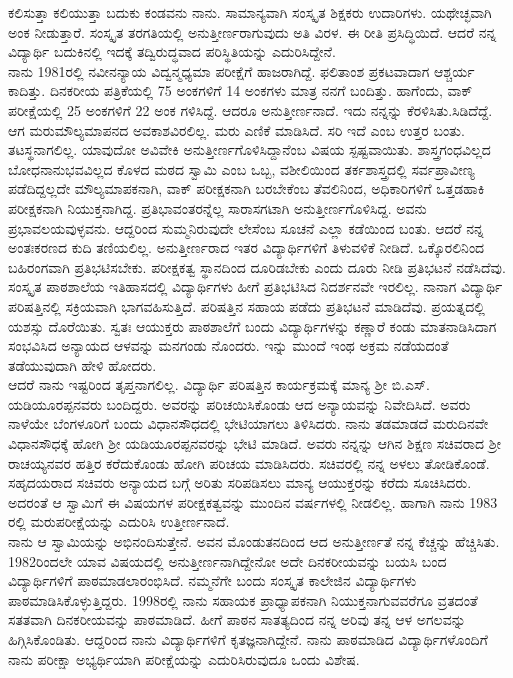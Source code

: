 {ಕಲಿಸುತ್ತಾ ಕಲಿಯುತ್ತಾ ಬದುಕು ಕಂಡವನು ನಾನು. ಸಾಮಾನ್ಯವಾಗಿ ಸಂಸ್ಕೃತ ಶಿಕ್ಷಕರು ಉದಾರಿಗಳು.  ಯಥೇಚ್ಛವಾಗಿ ಅಂಕ ನೀಡುತ್ತಾರೆ.  ಸಂಸ್ಕೃತ ತರಗತಿಯಲ್ಲಿ ಅನುತ್ತೀರ್ಣರಾಗುವುದು ಅತಿ ವಿರಳ. ಈ ರೀತಿ ಪ್ರಸಿದ್ಧಿಯಿದೆ. ಆದರೆ ನನ್ನ ವಿದ್ಯಾರ್ಥಿ ಬದುಕಿನಲ್ಲಿ ಇದಕ್ಕೆ ತದ್ವಿರುದ್ಧವಾದ ಪರಿಸ್ಥಿತಿಯನ್ನು ಎದುರಿಸಿದ್ದೇನೆ.  
~\\[0.4cm]
ನಾನು 1981ರಲ್ಲಿ ನವೀನನ್ಯಾಯ ವಿದ್ವನ್ಮಧ್ಯಮಾ ಪರೀಕ್ಷೆಗೆ ಹಾಜರಾಗಿದ್ದೆ.  ಫಲಿತಾಂಶ ಪ್ರಕಟವಾದಾಗ ಆಶ್ಚರ್ಯ ಕಾದಿತ್ತು.  ದಿನಕರೀಯ ಪತ್ರಿಕೆಯಲ್ಲಿ 75 ಅಂಕಗಳಿಗೆ 14 ಅಂಕಗಳು ಮಾತ್ರ ನನಗೆ ಬಂದಿತ್ತು. ಹಾಗೆಂದು, ವಾಕ್ ಪರೀಕ್ಷೆಯಲ್ಲಿ 25 ಅಂಕ\-ಗಳಿಗೆ 22 ಅಂಕ ಗಳಿಸಿದ್ದೆ.  ಆದರೂ ಅನುತ್ತೀರ್ಣನಾದೆ.  ಇದು ನನ್ನನ್ನು ಕೆರಳಿಸಿತು.\break  ಸಿಡಿದೆದ್ದೆ. ಆಗ ಮರುಮೌಲ್ಯಮಾಪನದ ಅವಕಾಶವಿರಲಿಲ್ಲ.  ಮರು ಎಣಿಕೆ ಮಾಡಿಸಿದೆ.  ಸರಿ ಇದೆ ಎಂಬ ಉತ್ತರ ಬಂತು.  ತಟಸ್ಥನಾಗಲಿಲ್ಲ.  ಯಾವುದೋ ಅವಿವೇಕಿ ಅನುತ್ತೀರ್ಣ\-ಗೊಳಿಸಿದ್ದಾನೆಂಬ  ವಿಷಯ ಸ್ಪಷ್ಟವಾಯಿತು.  ಶಾಸ್ತ್ರಗಂಧವಿಲ್ಲದ ಬೋಧನಾನುಭವ\-ವಿಲ್ಲದ ಕೊಳದ ಮಠದ ಸ್ವಾಮಿ ಎಂಬ ಒಬ್ಬ, ವಶೀಲಿಯಿಂದ ತರ್ಕಶಾಸ್ತ್ರದಲ್ಲಿ ಸರ್ವ\-ಪ್ರಾವೀಣ್ಯ ಪಡೆದಿದ್ದಲ್ಲದೇ ಮೌಲ್ಯಮಾಪಕನಾಗಿ, ವಾಕ್ ಪರೀಕ್ಷಕನಾಗಿ ಬರಬೇಕೆಂಬ ತೆವಲಿನಿಂದ, ಅಧಿಕಾರಿಗಳಿಗೆ ಒತ್ತಡಹಾಕಿ ಪರೀಕ್ಷಕನಾಗಿ ನಿಯುಕ್ತನಾಗಿದ್ದ.  ಪ್ರತಿಭಾ\-ವಂತರನ್ನೆಲ್ಲ ಸಾರಾಸಗಟಾಗಿ ಅನುತ್ತೀರ್ಣಗೊಳಿಸಿದ್ದ.  ಅವನು ಪ್ರಭಾವಲಯವುಳ್ಳವನು.  ಆದ್ದರಿಂದ ಸುಮ್ಮನಿರುವುದೇ ಲೇಸೆಂಬ ಸೂಚನೆ ಎಲ್ಲಾ ಕಡೆಯಿಂದ ಬಂತು.  ಆದರೆ ನನ್ನ ಅಂತಃಕರಣದ ಕುದಿ ತಣಿಯಲಿಲ್ಲ.  ಅನುತ್ತೀರ್ಣರಾದ ಇತರ \hbox{ವಿದ್ಯಾರ್ಥಿಗಳಿಗೆ} \hbox{ತಿಳುವಳಿಕೆ} ನೀಡಿದೆ.  ಒಕ್ಕೊರಲಿನಿಂದ ಬಹಿರಂಗವಾಗಿ ಪ್ರತಿಭಟಿಸಬೇಕು. \hbox{ಪರೀಕ್ಷಕತ್ವ} ಸ್ಥಾನದಿಂದ ದೂರಿಡಬೇಕು ಎಂದು ದೂರು ನೀಡಿ ಪ್ರತಿಭಟನೆ ನಡೆಸಿದೆವು.  ಸಂಸ್ಕೃತ ಪಾಠಶಾಲೆಯ ಇತಿಹಾಸದಲ್ಲಿ ವಿದ್ಯಾರ್ಥಿಗಳು ಹೀಗೆ ಪ್ರತಿಭಟಿಸಿದ ನಿದರ್ಶನವೇ ಇರಲಿಲ್ಲ.  ನಾನಾಗ ವಿದ್ಯಾರ್ಥಿ ಪರಿಷತ್ತಿನಲ್ಲಿ ಸಕ್ರಿಯವಾಗಿ ಭಾಗವಹಿಸುತ್ತಿದೆ.  ಪರಿಷತ್ತಿನ ಸಹಾಯ ಪಡೆದು ಪ್ರತಿಭಟನೆ ಮಾಡಿದೆವು.  ಪ್ರಯತ್ನದಲ್ಲಿ ಯಶಸ್ಸು ದೊರೆಯಿತು.  ಸ್ವತಃ ಆಯುಕ್ತರು ಪಾಠಶಾಲೆಗೆ ಬಂದು ವಿದ್ಯಾರ್ಥಿಗಳನ್ನು ಕಣ್ಣಾರೆ ಕಂಡು ಮಾತನಾಡಿಸಿದಾಗ ಸಂಭವಿ\-ಸಿದ ಅನ್ಯಾಯದ ಆಳವನ್ನು ಮನಗಂಡು ನೊಂದರು.  ಇನ್ನು ಮುಂದೆ ಇಂಥ ಅಕ್ರಮ ನಡೆಯದಂತೆ ತಡೆಯುವುದಾಗಿ ಹೇಳಿ ಹೋದರು. 
~\\[0.4cm]
ಆದರೆ ನಾನು ಇಷ್ಟರಿಂದ ತೃಪ್ತನಾಗಲಿಲ್ಲ.  ವಿದ್ಯಾರ್ಥಿ ಪರಿಷತ್ತಿನ ಕಾರ್ಯಕ್ರಮಕ್ಕೆ ಮಾನ್ಯ ಶ್ರೀ ಬಿ.ಎಸ್. ಯಡಿಯೂರಪ್ಪನವರು ಬಂದಿದ್ದರು.  ಅವರನ್ನು ಪರಿಚಯಿಸಿಕೊಂಡು ಆದ ಅನ್ಯಾಯವನ್ನು ನಿವೇದಿಸಿದೆ.  ಅವರು ನಾಳೆಯೇ ಬೆಂಗಳೂರಿಗೆ ಬಂದು ವಿಧಾನಸೌಧದಲ್ಲಿ ಭೇಟಿಯಾಗಲು ತಿಳಿಸಿದರು.  ನಾನು ತಡಮಾಡದೆ ಮರುದಿನವೇ ವಿಧಾನಸೌಧಕ್ಕೆ ಹೋಗಿ ಶ್ರೀ ಯಡಿಯೂರಪ್ಪನವರನ್ನು ಭೇಟಿ ಮಾಡಿದೆ.  ಅವರು ನನ್ನನ್ನು ಆಗಿನ ಶಿಕ್ಷಣ ಸಚಿವರಾದ ಶ್ರೀ ರಾಚಯ್ಯನವರ ಹತ್ತಿರ ಕರೆದುಕೊಂಡು ಹೋಗಿ ಪರಿಚಯ ಮಾಡಿಸಿದರು.  ಸಚಿವರಲ್ಲಿ ನನ್ನ ಅಳಲು ತೋಡಿಕೊಂಡೆ.  ಸಹೃದಯರಾದ ಸಚಿವರು ಅನ್ಯಾಯದ ಬಗ್ಗೆ ಅರಿತು ಸರಿಪಡಿಸಲು ಮಾನ್ಯ ಆಯುಕ್ತರನ್ನು ಕರೆದು ಸೂಚಿಸಿ\-ದರು.  ಅದರಂತೆ ಆ ಸ್ವಾಮಿಗೆ ಈ ವಿಷಯಗಳ ಪರೀಕ್ಷಕತ್ವವನ್ನು ಮುಂದಿನ ವರ್ಷಗಳಲ್ಲಿ ನೀಡಲಿಲ್ಲ.  ಹಾಗಾಗಿ ನಾನು 1983 ರಲ್ಲಿ ಮರುಪರೀಕ್ಷೆಯನ್ನು ಎದುರಿಸಿ ಉತ್ತೀರ್ಣನಾದೆ.  
~\\[0.4cm]
ನಾನು ಆ ಸ್ವಾಮಿಯನ್ನು ಅಭಿನಂದಿಸುತ್ತೇನೆ.  ಅವನ ಮೊಂಡುತನದಿಂದ ಆದ ಅನುತ್ತೀರ್ಣತೆ ನನ್ನ ಕೆಚ್ಚನ್ನು ಹೆಚ್ಚಿಸಿತು.  1982ರಿಂದಲೇ ಯಾವ ವಿಷಯದಲ್ಲಿ ಅನುತ್ತೀರ್ಣ\-ನಾಗಿದ್ದೇನೋ ಅದೇ ದಿನಕರೀಯವನ್ನು ಬಯಸಿ ಬಂದ ವಿದ್ಯಾರ್ಥಿಗಳಿಗೆ ಪಾಠ\-ಮಾಡಲಾರಂಭಿಸಿದೆ. ನಮ್ಮನೆಗೇ ಬಂದು ಸಂಸ್ಕೃತ ಕಾಲೇಜಿನ ವಿದ್ಯಾರ್ಥಿಗಳು ಪಾಠ\-ಮಾಡಿಸಿಕೊಳ್ಳುತ್ತಿದ್ದರು.  1998ರಲ್ಲಿ ನಾನು ಸಹಾಯಕ ಪ್ರಾಧ್ಯಾಪಕನಾಗಿ ನಿಯುಕ್ತನಾಗುವವರೆಗೂ ವ್ರತದಂತೆ ಸತತವಾಗಿ ದಿನಕರೀಯವನ್ನು ಪಾಠಮಾಡಿದೆ.  ಹೀಗೆ ಪಾಠನ ಸಾತತ್ಯ\-ದಿಂದ ನನ್ನ ಅರಿವು ತನ್ನ ಆಳ ಅಗಲವನ್ನು ಹಿಗ್ಗಿಸಿಕೊಂಡಿತು. ಆದ್ದರಿಂದ ನಾನು ವಿದ್ಯಾರ್ಥಿಗಳಿಗೆ ಕೃತಜ್ಞನಾಗಿದ್ದೇನೆ.  ನಾನು ಪಾಠಮಾಡಿದ ವಿದ್ಯಾರ್ಥಿ\-ಗಳೊಂದಿಗೆ ನಾನು ಪರೀಕ್ಷಾ ಅಭ್ಯರ್ಥಿಯಾಗಿ ಪರೀಕ್ಷೆಯನ್ನು ಎದುರಿಸಿರುವುದೂ ಒಂದು ವಿಶೇಷ.

}
